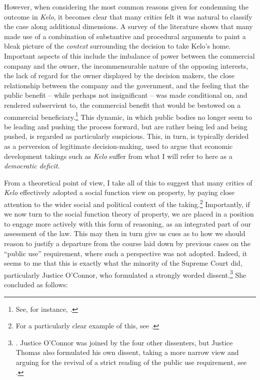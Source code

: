 However, when considering the most common reasons given for condemning the outcome in {\it Kelo}, it becomes clear that many critics felt it was natural to classify the case along additional dimensions. A survey of the literature shows that many made use of a combination of substantive and procedural arguments to paint a bleak picture of the {\it context} surrounding the decision to take Kelo's home. Important aspects of this include the imbalance of power between the commercial company and the owner, the incommensurable nature of the opposing interests, the lack of regard for the owner displayed by the decision makers, the close relationship between the company and the government, and the feeling that the public benefit -- while perhaps not insignificant -- was made conditional on, and rendered subservient to, the commercial benefit that would be bestowed on a commercial beneficiary.\footnote{See, for instance, \cite{underkuffler06,somin07,sandefur06,cohen06,hafetz09,hudson10}.}  This dynamic, in which public bodies no longer seem to be leading and pushing the process forward, but are rather being led and being pushed, is regarded as particularly suspicious. This, in turn, is typically derided as a perversion of legitimate decision-making, used to argue that economic development takings such as {\it Kelo} suffer from what I will refer to here as a {\it democratic deficit}.

From a theoretical point of view, I take all of this to suggest that many critics of {\it Kelo} effectively adopted a social function view on property, by paying close attention to the wider social and political context of the taking.\footnote{For a particularly clear example of this, see \cite{underkuffler06}.} Importantly, if we now turn to the social function theory of property, we are placed in a position to engage more actively with this form of reasoning, as an integrated part of our assessment of the law. This may then in turn give us cues as to how we should reason to justify a departure from the course laid down by previous cases on the ``public use'' requirement, where such a perspective was not adopted. Indeed, it seems to me that this is exactly what the minority of the Supreme Court did, particularly Justice O'Connor, who formulated a strongly worded dissent.\footnote{\cite[494-505]{kelo05}. Justice O'Connor was joined by the four other dissenters, but Justice Thomas also formulated his own dissent, taking a more narrow view and arguing for the revival of a strict reading of the public use requirement, see \cite[505-523]{kelo05}.} She concluded as follows:

